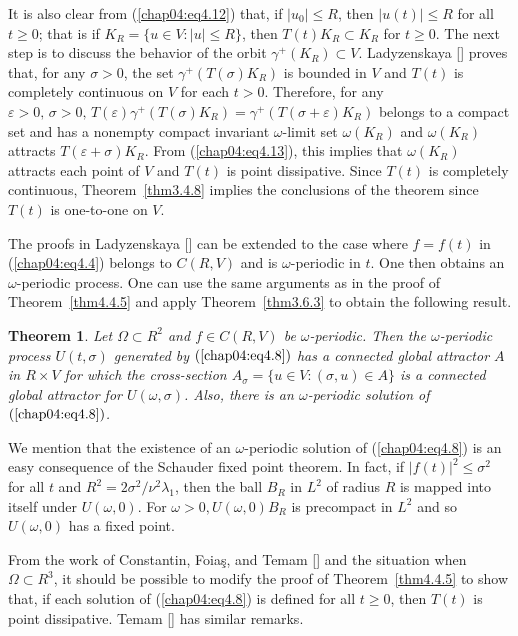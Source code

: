 \documentclass{surv-l}
\theoremstyle{plain}
\newtheorem{theorem}{Theorem}[section]
\theoremstyle{definition}
\numberwithin{equation}{section}
\numberwithin{figure}{chapter}
\begin{document}
It is also clear from (\ref{chap04:eq4.12}) that, if $|u_{0}|\leq R$, then $|u(t)|\leq R$ for all $t\geq 0$; that is if $K_{R}=\{u\in V\!: |u| \leq R\}$, then $T(t)K_{R}\subset K_{R}$ for $t\geq 0$. The next step is to discuss the behavior of the orbit $\gamma^{+}(K_{R})\subset V$. Ladyzenskaya [\citeyear{1972l}] proves that, for any $\sigma>0$, the set $\gamma^{+}(T(\sigma)K_{R})$ is bounded in $V$ and $T(t)$ is completely continuous on $V$ for each $t>0$. Therefore, for any $\varepsilon>0,\, \sigma>0,\, T(\varepsilon)\gamma^{+}(T(\sigma)K_{R})=\gamma^{+}(T(\sigma+\varepsilon)K_{R})$
belongs to a compact set and has a nonempty compact invariant $\omega$-limit set $\omega(K_{R})$ and $\omega(K_{R})$ attracts $T(\varepsilon+\sigma)K_{R}$. From (\ref{chap04:eq4.13}), this implies that $\omega(K_{R})$ attracts each point of $V$ and $T(t)$ is point dissipative. Since $T(t)$ is completely continuous, Theorem~\ref{thm3.4.8} implies the conclusions of the theorem since $T(t)$ is one-to-one on $V$.

The proofs in Ladyzenskaya [\citeyear{1972l}] can be extended to the case where $f=f(t)$ in (\ref{chap04:eq4.4}) belongs to $C(R, V)$ and is $\omega$-periodic in $t$. One then obtains an $\omega$-periodic process. One can use the same arguments as in the proof of Theorem~\ref{thm4.4.5} and apply Theorem~\ref{thm3.6.3} to obtain the following result.

\begin{theorem}\label{thm4.4.6} Let $\Omega\subset R^{2}$ and $f\in C(R, V)$ be $\omega$-periodic. Then the
$\omega$-periodic process $U(t, \sigma)$ generated by $(\ref{chap04:eq4.8})$ has a connected global attractor $A$ in $R\times V$ for which the cross-section $A_{\sigma}=\{u\in V: (\sigma, u)\in A\}$ is a connected global attractor for $U(\omega, \sigma)$. Also, there is an $\omega$-periodic solution of $(\ref{chap04:eq4.8})$.
\end{theorem}

We mention that the existence of an $\omega$-periodic solution of (\ref{chap04:eq4.8}) is an easy consequence of the Schauder fixed point theorem. In fact, if $|f(t)|^{2}\leq\sigma^{2}$ for all $t$ and $R^{2}=2\sigma^{2}/\nu^{2}\lambda_{1}$, then the ball $B_{R}$ in $L^{2}$ of radius $R$ is mapped into itself under $U(\omega, 0)$. For $\omega>0, U(\omega, 0)B_{R}$ is precompact in $L^{2}$ and so $U(\omega, 0)$ has a fixed point.

From the work of Constantin, Foia\c{s}, and Temam [\citeyear{1985cft}] and the situation when $\Omega\subset R^{3}$, it should be possible to modify the proof of Theorem~\ref{thm4.4.5} to show that, if each solution of (\ref{chap04:eq4.8}) is defined for all $t\geq 0$, then $T(t)$ is point dissipative. Temam [\citeyear{1984t}] has similar remarks.
\end{document}
